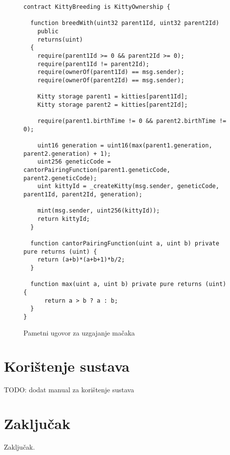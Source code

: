 \documentclass[times, utf8, tehnicka_dokumentacija]{fer}
\begin{document}
\begin{figure}
\begin{lstlisting}
contract KittyBreeding is KittyOwnership {

  function breedWith(uint32 parent1Id, uint32 parent2Id)
    public
    returns(uint)
  {
    require(parent1Id >= 0 && parent2Id >= 0);
    require(parent1Id != parent2Id);
    require(ownerOf(parent1Id) == msg.sender);
    require(ownerOf(parent2Id) == msg.sender);

    Kitty storage parent1 = kitties[parent1Id];
    Kitty storage parent2 = kitties[parent2Id];

    require(parent1.birthTime != 0 && parent2.birthTime != 0);

    uint16 generation = uint16(max(parent1.generation, parent2.generation) + 1);
    uint256 geneticCode = cantorPairingFunction(parent1.geneticCode, parent2.geneticCode);
    uint kittyId = _createKitty(msg.sender, geneticCode, parent1Id, parent2Id, generation);

    mint(msg.sender, uint256(kittyId));
    return kittyId;
  }

  function cantorPairingFunction(uint a, uint b) private pure returns (uint) {
    return (a+b)*(a+b+1)*b/2;
  }

  function max(uint a, uint b) private pure returns (uint) {
      return a > b ? a : b;
  }
}
\end{lstlisting}
\caption{Pametni ugovor za uzgajanje mačaka}
\label{lst:kittymarket}
\end{figure}

\chapter{Korištenje sustava}
TODO: dodat manual za korištenje sustava

\chapter{Zaključak}
Zaključak.



\end{document}
